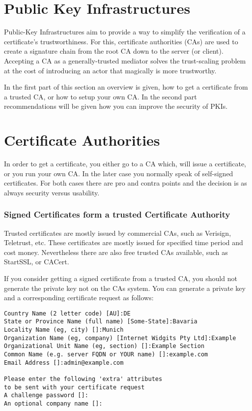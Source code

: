\section{Public Key Infrastructures}
\label{section:PKIs}

Public-Key Infrastructures aim to provide a way to simplify the verification of
a certificate's trustworthiness.  For this, certificate authorities (CAs) are
used to create a signature chain from the root CA down to the server (or client).
Accepting a CA as a generally-trusted mediator solves the trust-scaling problem
at the cost of introducing an actor that magically is more trustworthy.

In the first part of this section an overview is given, how to get a certificate from
a trusted CA, or how to setup your own CA. In the second part recommendations will be 
given how you can improve the security of PKIs.

\section{Certificate Authorities}
\label{sec:cas}
In order to get a certificate, you either go to a CA which, will issue a certificate,
or you run your own CA. In the later case you normally speak of self-signed 
certificates. For both cases there are pro and contra points and the decision is
as always security versus usability.

\subsubsection{Signed Certificates form a trusted Certificate Authority}
\label{sec:signcertfromca}
Trusted certificates are mostly issued by commercial CAs, such as Verisign, Teletrust, etc.
These certificates are mostly issued for specified time period and cost money. Nevertheless
there are also free trusted CAs available, such as StartSSL, or CACert.

If you consider getting a signed certificate from a trusted CA, you should not generate the 
private key not on the CAs system. You can generate a private key and a corresponding 
certificate request as follows:

\begin{lstlisting}[breaklines]
% openssl req -new -nodes -keyout <servername>.key -out <servername>.csr -newkey rsa:<keysize>
Country Name (2 letter code) [AU]:DE
State or Province Name (full name) [Some-State]:Bavaria
Locality Name (eg, city) []:Munich
Organization Name (eg, company) [Internet Widgits Pty Ltd]:Example
Organizational Unit Name (eg, section) []:Example Section
Common Name (e.g. server FQDN or YOUR name) []:example.com
Email Address []:admin@example.com

Please enter the following 'extra' attributes
to be sent with your certificate request
A challenge password []:
An optional company name []:
\end{lstlisting}

